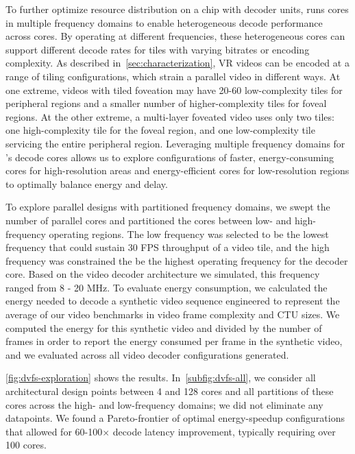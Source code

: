 To further optimize resource distribution on a chip with decoder units, \nameArch runs cores in multiple frequency domains to enable heterogeneous decode performance across cores.
By operating at different frequencies, these heterogeneous cores can support different decode rates for tiles with varying bitrates or encoding complexity.
As described in~\ref{sec:characterization}, VR videos can be encoded at a range of tiling configurations, which strain a parallel video in different ways.
At one extreme, videos with tiled foveation may have 20-60 low-complexity tiles for peripheral regions and a smaller number of higher-complexity tiles for foveal regions.
At the other extreme, a multi-layer foveated video uses only two tiles: one high-complexity tile for the foveal region, and one low-complexity tile servicing the entire peripheral region.
Leveraging multiple frequency domains for \nameArch's decode cores allows us to explore configurations of faster, energy-consuming cores for high-resolution areas and energy-efficient cores for low-resolution regions to optimally balance energy and delay.

To explore parallel designs with partitioned frequency domains, we swept the number of parallel cores and partitioned the cores between low- and high-frequency operating regions.
The low frequency was selected to be the lowest frequency that could sustain 30 FPS throughput of a video tile, and the high frequency was constrained the be the highest operating frequency for the decoder core.
Based on the video decoder architecture we simulated, this frequency ranged from 8 - 20 MHz.
To evaluate energy consumption, we calculated the energy needed to decode a synthetic video sequence engineered to represent the average of our video benchmarks in video frame complexity and CTU sizes.
We computed the energy for this synthetic video and divided by the number of frames in order to report the energy consumed per frame in the synthetic video, and we evaluated across all video decoder configurations generated.

\ref{fig:dvfs-exploration} shows the results. In~\ref{subfig:dvfs-all}, we consider all architectural design points between 4 and 128 cores and all partitions of these cores across the high- and low-frequency domains; we did not eliminate any datapoints.
We found a Pareto-frontier of optimal energy-speedup configurations that allowed for 60-100$\times$ decode latency improvement, typically requiring over 100 cores.


